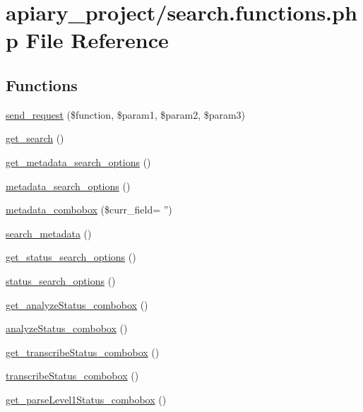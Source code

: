 \hypertarget{search_8functions_8php}{
\section{apiary_project/search.functions.php File Reference}
\label{search_8functions_8php}
}
\subsection*{Functions}
\begin{DoxyCompactItemize}
\item 
\hyperlink{search_8functions_8php_a78bd2c85ad1dcdc1fb68e40605d593b0}{send\_\-request} (\$function, \$param1, \$param2, \$param3)
\item 
\hyperlink{search_8functions_8php_ad070411c3e0f82ab8f3f9cebdea1dd6a}{get\_\-search} ()
\item 
\hyperlink{search_8functions_8php_a1ea6f95533a64c01b6d8a294a22b367e}{get\_\-metadata\_\-search\_\-options} ()
\item 
\hyperlink{search_8functions_8php_ad3b79112dc41cc34b986c4f462609425}{metadata\_\-search\_\-options} ()
\item 
\hyperlink{search_8functions_8php_ad1edff4b206d5592ad22c8609e8e453f}{metadata\_\-combobox} (\$curr\_\-field= '')
\item 
\hyperlink{search_8functions_8php_af16b87b19a80e27adc34631fcf8dc679}{search\_\-metadata} ()
\item 
\hyperlink{search_8functions_8php_a5d1a3df4c9bf841aa94fe6f4b8b84b22}{get\_\-status\_\-search\_\-options} ()
\item 
\hyperlink{search_8functions_8php_ae8e41e2bb51042ca85a9079cbfac904c}{status\_\-search\_\-options} ()
\item 
\hyperlink{search_8functions_8php_a3d0d025469031fbff024e8c147bae9b9}{get\_\-analyzeStatus\_\-combobox} ()
\item 
\hyperlink{search_8functions_8php_a9c6395393919f0f0803a3645193ab4bf}{analyzeStatus\_\-combobox} ()
\item 
\hyperlink{search_8functions_8php_a659ab8660fbcf76342bfcfece2c26d28}{get\_\-transcribeStatus\_\-combobox} ()
\item 
\hyperlink{search_8functions_8php_a3faf33f802668cbc4feb92a9df27f2b1}{transcribeStatus\_\-combobox} ()
\item 
\hyperlink{search_8functions_8php_ade3708d63e72b4a6a2f8977054dcf167}{get\_\-parseLevel1Status\_\-combobox} ()

\end{DoxyCompactItemize}
